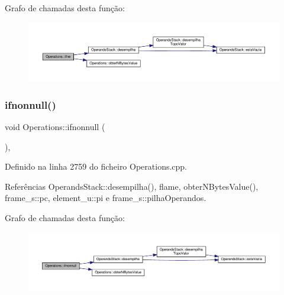 Grafo de chamadas desta função\+:
\nopagebreak
\begin{figure}[H]
\begin{center}
\leavevmode
\includegraphics[width=350pt]{classOperations_aaadc2a6aaf1d3be06e918930622dad29_cgraph}
\end{center}
\end{figure}
\mbox{\label{classOperations_a00af7ab198690f5d3e6c7f2b2d374194}} 
\subsubsection{\texorpdfstring{ifnonnull()}{ifnonnull()}}
{\footnotesize\ttfamily void Operations\+::ifnonnull (\begin{DoxyParamCaption}{ }\end{DoxyParamCaption})\hspace{0.3cm}{\ttfamily [static]}, {\ttfamily [private]}}



Definido na linha 2759 do ficheiro Operations.\+cpp.



Referências Operands\+Stack\+::desempilha(), flame, obter\+N\+Bytes\+Value(), frame\+\_\+s\+::pc, element\+\_\+u\+::pi e frame\+\_\+s\+::pilha\+Operandos.

Grafo de chamadas desta função\+:
\nopagebreak
\begin{figure}[H]
\begin{center}
\leavevmode
\includegraphics[width=350pt]{classOperations_a00af7ab198690f5d3e6c7f2b2d374194_cgraph}
\end{center}
\end{figure}
\mbox{\label{classOperations_a030f5995f8f357254e543d0cbce2d189}} 
